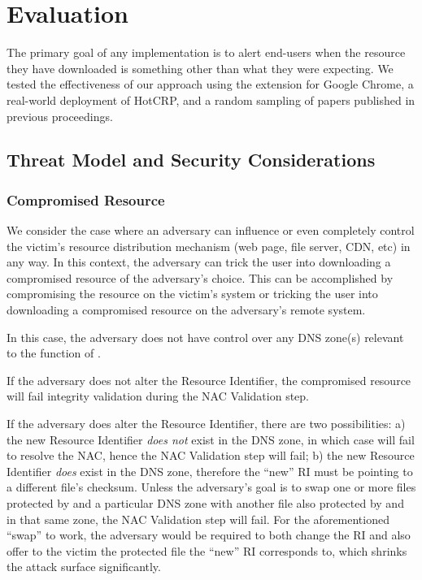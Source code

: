 \section{Evaluation} \label{sec:evaluation}

The primary goal of any \SYSTEM{} implementation is to alert end-users when the
resource they have downloaded is something other than what they were expecting.
We tested the effectiveness of our approach using the \SYSTEM{} extension for
Google Chrome, a real-world deployment of HotCRP, and a random sampling of
papers published in previous \CONFERENCE{} proceedings.

\subsection{Threat Model and Security Considerations}

\subsubsection{Compromised Resource}

We consider the case where an adversary can influence or even completely control
the victim's resource distribution mechanism (web page, file server, CDN, etc)
in any way. In this context, the adversary can trick the user into downloading a
compromised resource of the adversary's choice. This can be accomplished by
compromising the resource on the victim's system or tricking the user into
downloading a compromised resource on the adversary's remote system.

In this case, the adversary does not have control over any DNS zone(s) relevant
to the function of \SYSTEM{}.

If the adversary does not alter the Resource Identifier, the compromised
resource will fail integrity validation during the NAC Validation step.

If the adversary does alter the Resource Identifier, there are two
possibilities: a) the new Resource Identifier \textit{does not} exist in the DNS
zone, in which case \SYSTEM{} will fail to resolve the NAC, hence the NAC
Validation step will fail; b) the new Resource Identifier \textit{does} exist in
the DNS zone, therefore the ``new'' RI must be pointing to a different file's
checksum. Unless the adversary's goal is to swap one or more files protected by
\SYSTEM{} and a particular DNS zone with another file also protected by
\SYSTEM{} and in that same zone, the NAC Validation step will fail. For the
aforementioned ``swap'' to work, the adversary would be required to both change
the RI and also offer to the victim the \SYSTEM{} protected file the ``new'' RI
corresponds to, which shrinks the attack surface significantly.

